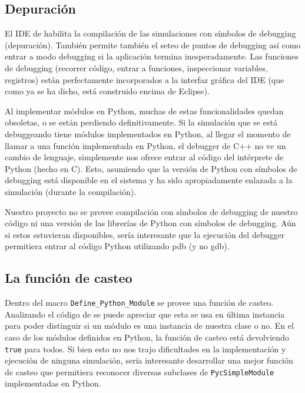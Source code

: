 \subsection{Depuración}

El IDE de \omnetpp{} habilita la compilación de las simulaciones con símbolos de
debugging (depuración). También permite también el seteo de puntos de debugging
así como entrar a modo debugging si la aplicación termina inesperadamente. Las
funciones de debugging (recorrer código, entrar a funciones, inspeccionar
variables, registros) están perfectamente incorporados a la interfaz gráfica
del IDE (que como ya se ha dicho, está construido encima de Eclipse).

Al implementar módulos en Python, muchas de estas funcionalidades quedan
obsoletas, o se están perdiendo definitivamente. Si la simulación que se está
debuggeando tiene módulos implementados en Python, al llegar el momento de
llamar a una función implementada en Python, el debugger de C++ no ve un cambio
de lenguaje, simplemente nos ofrece entrar al código del intérprete de Python
(hecho en C). Esto, asumiendo que la versión de Python con símbolos de
debugging está disponible en el sistema y ha sido apropiadamente enlazada a la
simulación (durante la compilación).

Nuestro proyecto no se provee compilación con símbolos de debugging de nuestro
código ni una versión de las librerías de Python con símbolos de debugging. Aún
si estos estuvieran disponibles, sería interesante que la ejecución del
debugger permitiera entrar al código Python utilizando pdb (y no gdb).

\subsection{La función de casteo}

Dentro del macro \verb!Define_Python_Module! se provee una función de casteo.
Analizando el código de \omnetpp{} se puede apreciar que esta se usa en última
instancia para poder distinguir si un módulo es una instancia de nuestra clase
o no. En el caso de los módulos definidos en Python, la función de casteo está
devolviendo \verb!true! para todos. Si bien esto no nos trajo dificultades en la
implementación y ejecución de ninguna simulación, sería interesante desarrollar
una mejor función de casteo que permitiera reconocer diversas subclases de
\verb!PycSimpleModule! implementadas en Python.
